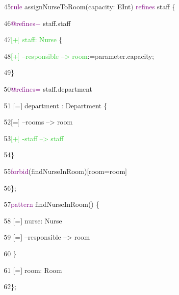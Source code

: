 {
	
	45\hspace{0.5cm}\textcolor{Purple}{rule} assignNurseToRoom(capacity: EInt) \textcolor{Purple}{refines} staff \{ 
	
	46\hspace{1cm}\textcolor{Purple}{@refines+} staff.staff
	
	47\hspace{1cm}\textcolor{LimeGreen}{[+] staff: Nurse} \{
	
	48\hspace{1.5cm}\textcolor{LimeGreen}{[+] --responsible --> room}:=parameter.capacity;
	
	49\hspace{1cm}\}
	
	50\hspace{1cm}\textcolor{Purple}{@refines=} staff.department
	
	51\hspace{1cm}		[=] department : Department \{
	
	52\hspace{1.5cm}[=] --rooms --> room
	
	53\hspace{1.5cm}\textcolor{LimeGreen}{[+] -staff --> staff}
	
	54\hspace{1cm}\}
	
	55\hspace{0.5cm}\textcolor{Purple}{forbid}(findNurseInRoom)[room=room] 
	
	56\hspace{0.5cm}\}; \newline
	
	57\hspace{0.5cm}\textcolor{Purple}{pattern} findNurseInRoom() \{
	
	58\hspace{1cm}		[=] nurse: Nurse {
	
	59\hspace{1.5cm}			[=] --responsible --> room
	
	60\hspace{1cm}  \}
	
	61\hspace{1cm}		[=] room: Room 
	
	62\hspace{0.5cm}\};\newline\newline
	
}

}
